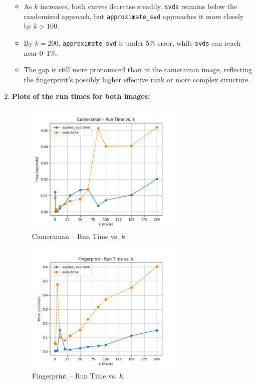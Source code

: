 \documentclass[11pt,a4paper, margin=1in]{article}
\begin{document}
\begin{enumerate}
\begin{itemize}
      \item As $k$ increases, both curves decrease steadily. 
      \texttt{svds} remains below the randomized approach, 
      but \texttt{approximate\_svd} approaches it more closely by $k>100$.
      
      \item By $k=200$, \texttt{approximate\_svd} is under 5\% error, 
      while \texttt{svds} can reach near 0--1\%. 
      
      \item The gap is still more pronounced than in the cameraman image, 
      reflecting the fingerprint's possibly higher effective rank or 
      more complex structure.
    \end{itemize}

    \item 
    \textbf{Plots of the run times for both images:}

    \begin{figure}[H]
        \centering
        \includegraphics[width=0.72\textwidth]{Cameraman_run_time_vs_k.png}
        \caption{Cameraman -- Run Time vs. $k$.}
        \label{fig:time_cam}
    \end{figure}
      
    \begin{figure}[H]
        \centering
        \includegraphics[width=0.72\textwidth]{Fingerprint_run_time_vs_k.png}
        \caption{Fingerprint -- Run Time vs. $k$.}
        \label{fig:time_fpt}
    \end{figure}


\end{enumerate}
\end{document}
